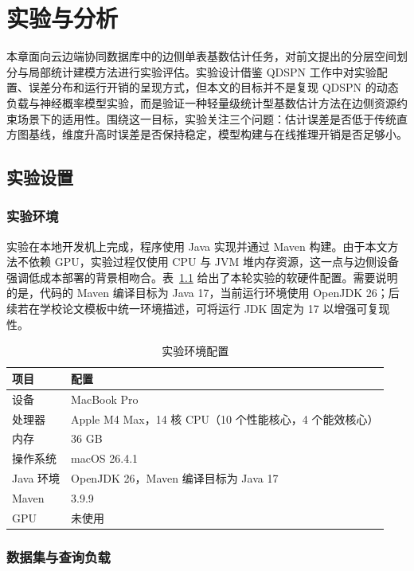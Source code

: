 \chapter{实验与分析}

本章面向云边端协同数据库中的边侧单表基数估计任务，对前文提出的分层空间划分与局部统计建模方法进行实验评估。实验设计借鉴 QDSPN 工作中对实验配置、误差分布和运行开销的呈现方式，但本文的目标并不是复现 QDSPN 的动态负载与神经概率模型实验，而是验证一种轻量级统计型基数估计方法在边侧资源约束场景下的适用性。围绕这一目标，实验关注三个问题：估计误差是否低于传统直方图基线，维度升高时误差是否保持稳定，模型构建与在线推理开销是否足够小。

\section{实验设置}

\subsection{实验环境}

实验在本地开发机上完成，程序使用 Java 实现并通过 Maven 构建。由于本文方法不依赖 GPU，实验过程仅使用 CPU 与 JVM 堆内存资源，这一点与边侧设备强调低成本部署的背景相吻合。表~\ref{tab:env} 给出了本轮实验的软硬件配置。需要说明的是，代码的 Maven 编译目标为 Java 17，当前运行环境使用 OpenJDK 26；后续若在学校论文模板中统一环境描述，可将运行 JDK 固定为 17 以增强可复现性。

\begin{table}[htbp]
  \centering
  \caption{实验环境配置}
  \label{tab:env}
  \begin{tabular}{ll}
    \hline
    项目 & 配置 \\
    \hline
    设备 & MacBook Pro \\
    处理器 & Apple M4 Max，14 核 CPU（10 个性能核心，4 个能效核心） \\
    内存 & 36 GB \\
    操作系统 & macOS 26.4.1 \\
    Java 环境 & OpenJDK 26，Maven 编译目标为 Java 17 \\
    Maven & 3.9.9 \\
    GPU & 未使用 \\
    \hline
  \end{tabular}
\end{table}

\subsection{数据集与查询负载}

